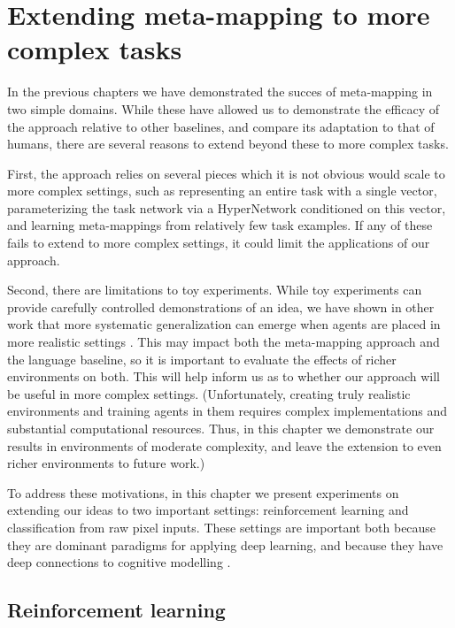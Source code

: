 \chapter{Extending meta-mapping to more complex tasks} \label{chapter:extending}
In the previous chapters we have demonstrated the succes of meta-mapping in two simple domains. While these have allowed us to demonstrate the efficacy of the approach relative to other baselines, and compare its adaptation to that of humans, there are several reasons to extend beyond these to more complex tasks. \par 
First, the approach relies on several pieces which it is not obvious would scale to more complex settings, such as representing an entire task with a single vector, parameterizing the task network via a HyperNetwork conditioned on this vector, and learning meta-mappings from relatively few task examples. If any of these fails to extend to more complex settings, it could limit the applications of our approach. \par
Second, there are limitations to toy experiments. While toy experiments can provide carefully controlled demonstrations of an idea, we have shown in other work that more systematic generalization can emerge when agents are placed in more realistic settings \citep{Hill2019a}. This may impact both the meta-mapping approach and the language baseline, so it is important to evaluate the effects of richer environments on both. This will help inform us as to whether our approach will be useful in more complex settings. (Unfortunately, creating truly realistic environments and training agents in them requires complex implementations and substantial computational resources. Thus, in this chapter we demonstrate our results in environments of moderate complexity, and leave the extension to even richer environments to future work.)\par 
To address these motivations, in this chapter we present experiments on extending our ideas to two important settings: reinforcement learning and classification from raw pixel inputs. These settings are important both because they are dominant paradigms for applying deep learning, and because they have deep connections to cognitive modelling \citep[e.g.][]{Yamins2014, Kriegeskorte2015, Momennejad2017}. \par

\section{Reinforcement learning} \label{sec:extending:rl}

